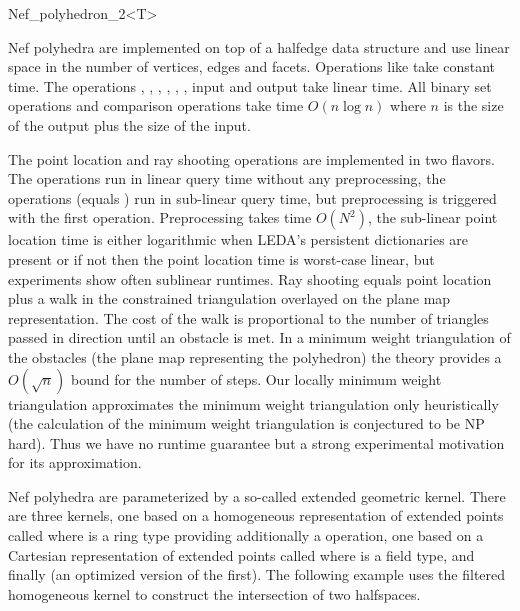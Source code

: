 \begin{ccRefClass}{Nef_polyhedron_2<T>}

\ccImplementation

Nef polyhedra are implemented on top of a halfedge data structure and
use linear space in the number of vertices, edges and facets.
Operations like  take constant time. The operations
, , , ,
, , input and output take linear
time. All binary set operations and comparison operations take time
$O(n \log n)$ where $n$ is the size of the output plus the size of the
input.

The point location and ray shooting operations are implemented in two
flavors. The  operations run in linear query time without
any preprocessing, the  operations (equals )
run in sub-linear query time, but preprocessing is triggered with the
first operation. Preprocessing takes time $O(N^2)$, the sub-linear
point location time is either logarithmic when LEDA's persistent
dictionaries are present or if not then the point location time is
worst-case linear, but experiments show often sublinear runtimes.  Ray
shooting equals point location plus a walk in the constrained
triangulation overlayed on the plane map representation. The cost of
the walk is proportional to the number of triangles passed in
direction  until an obstacle is met. In a minimum weight
triangulation of the obstacles (the plane map representing the
polyhedron) the theory provides a $O(\sqrt{n})$ bound for the number
of steps. Our locally minimum weight triangulation approximates the
minimum weight triangulation only heuristically (the calculation of
the minimum weight triangulation is conjectured to be NP hard). Thus
we have no runtime guarantee but a strong experimental motivation for
its approximation.

\ccExample

Nef polyhedra are parameterized by a so-called extended geometric
kernel. There are three kernels, one based on a homogeneous
representation of extended points called
 where  is a ring type providing
additionally a  operation, one based on a Cartesian
representation of extended points called 
where  is a field type, and finally
 (an optimized version of the
first). The following example uses the filtered homogeneous kernel to
construct the intersection of two halfspaces.


\end{ccRefClass}
